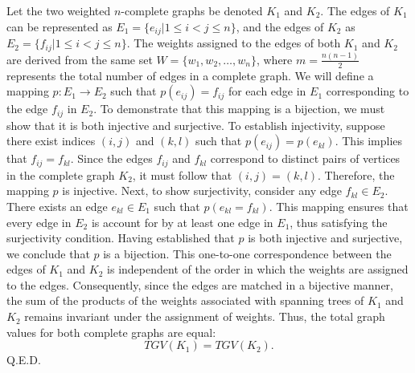 \documentclass{article}
\begin{document}
Let the two weighted $n$-complete graphs be denoted $K_{1}$ and $K_{2}$. The edges of $K_{1}$ can be represented as $E_{1}=\{e_{ij}|1\leq i<j\leq n\}$, and the edges of $K_{2}$ as $E_{2}=\{f_{ij}|1\leq i<j\leq n\}$. The weights assigned to the edges of both $K_{1}$ and $K_{2}$ are derived from the same set $W=\{w_{1},w_{2},\ldots,w_{n}\}$, where $m=\frac{n(n-1)}{2}$ represents the total number of edges in a complete graph. We will define a mapping $p:E_{1}\rightarrow E_{2}$ such that $p(e_{ij})=f_{ij}$ for each edge in $E_{1}$ corresponding to the edge $f_{ij}$ in $E_{2}$. To demonstrate that this mapping is a bijection, we must show that it is both injective and surjective. To establish injectivity, suppose there exist indices $(i,j)$ and $(k,l)$ such that $p(e_{ij})=p(e_{kl})$. This implies that $f_{ij}=f_{kl}$. Since the edges $f_{ij}$ and $f_{kl}$ correspond to distinct pairs of vertices in the complete graph $K_{2}$, it must follow that $(i,j)=(k,l)$. Therefore, the mapping $p$ is injective. Next, to show surjectivity, consider any edge $f_{kl}\in E_{2}$. There exists an edge $e_{kl}\in E_{1}$ such that $p(e_{kl}=f_{kl})$. This mapping ensures that every edge in $E_{2}$ is account for by at least one edge in $E_{1}$, thus satisfying the surjectivity condition. Having established that $p$ is both injective and surjective, we conclude that $p$ is a bijection. This one-to-one correspondence between the edges of $K_{1}$ and $K_{2}$ is independent of the order in which the weights are assigned to the edges. Consequently, since the edges are matched in a bijective manner, the sum of the products of the weights associated with spanning trees of $K_{1}$ and $K_{2}$ remains invariant under the assignment of weights. Thus, the total graph values for both complete graphs are equal: $$TGV(K_{1})=TGV(K_{2}).$$
Q.E.D.
\end{document}
